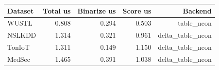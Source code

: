 \begin{tabular}{lrrrr}
\toprule
Dataset & Total us & Binarize us & Score us & Backend \\
\midrule
WUSTL & 0.808 & 0.294 & 0.503 & table\_neon \\
NSLKDD & 1.314 & 0.321 & 0.961 & delta\_table\_neon \\
TonIoT & 1.311 & 0.149 & 1.150 & delta\_table\_neon \\
MedSec & 1.465 & 0.391 & 1.038 & delta\_table\_neon \\
\bottomrule
\end{tabular}
